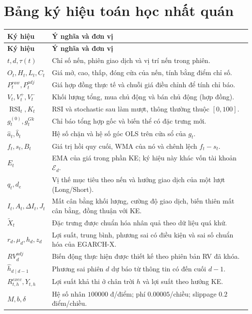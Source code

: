 \documentclass[12pt,a4paper,oneside]{article}
\newcommand{\RSI}{\operatorname{RSI}}
\begin{document}
\clearpage
\appendix
\section{Bảng ký hiệu toán học nhất quán}\label{app:symbols}
\small
\begin{longtable}{p{3.5cm}p{10.8cm}}
\toprule\textbf{Ký hiệu} & \textbf{Ý nghĩa và đơn vị}\\\midrule\endfirsthead
\toprule\textbf{Ký hiệu}&\textbf{Ý nghĩa và đơn vị}\\\midrule\endhead
$t,d,\tau(t)$ & Chỉ số nến, phiên giao dịch và vị trí nến trong phiên.\\
$O_t,H_t,L_t,C_t$ & Giá mở, cao, thấp, đóng cửa của nến, tính bằng điểm chỉ số.\\
$P_t^{raw},P_t^{adj}$ & Giá hợp đồng thực tế và chuỗi giá điều chỉnh để tính chỉ báo.\\
$V_t,V_t^+,V_t^-$ & Khối lượng tổng, mua chủ động và bán chủ động (hợp đồng).\\
$\RSI_t,K_t$ & RSI và stochastic sau làm mượt, thông thường thuộc $[0,100]$.\\
$g_t^{(0)},g_t^{Gk}$ & Chỉ báo tổng hợp gốc và biến thể có đặc trưng mới.\\
$\widehat a_t,\widehat b_t$ & Hệ số chặn và hệ số góc OLS trên cửa sổ của $g_t$.\\
$f_t,s_t,B_t$ & Giá trị hồi quy cuối, WMA của nó và chênh lệch $f_t-s_t$.\\
$E_t$ & EMA của giá trong phần KE; ký hiệu này khác vốn tài khoản $\mathcal E_d$.\\
$q_t,d_e$ & Vị thế mục tiêu theo nến và hướng giao dịch của một lượt (Long/Short).\\
$I_t,A_t,\Delta I_t,J_t$ & Mất cân bằng khối lượng, cường độ giao dịch, biến thiên mất cân bằng, đồng thuận với KE.\\
$\widetilde X_t$ & Đặc trưng được chuẩn hóa nhân quả theo dữ liệu quá khứ.\\
$r_d,\mu_d,h_d,z_d$ & Lợi suất, trung bình, phương sai có điều kiện và sai số chuẩn hóa của EGARCH-X.\\
$RV_d^{adj}$ & Biến động thực hiện được thiết kế theo phiên bản RV đã khóa.\\
$\widehat h_{d\mid d-1}$ & Phương sai phiên $d$ dự báo từ thông tin có đến cuối $d-1$.\\
$R_{t,h}^{exec},Y_{t,h}$ & Lợi suất khả thi ở chân trời $h$ và lợi suất theo hướng KE.\\
$M,b,\delta$ & Hệ số nhân $100000$ đ/điểm; phí $0.00005$/chiều; slippage $0.2$ điểm/chiều.\\

\end{longtable}
\end{document}
